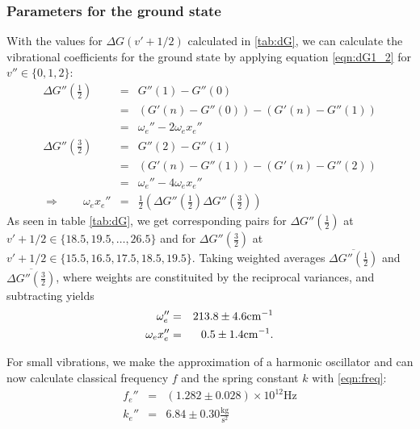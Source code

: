 \subsubsection{Parameters for the ground state}
With the values for $\Delta G(v' + 1/2)$ calculated in \ref{tab:dG}, we can calculate the vibrational coefficients for 
the ground state by applying equation \eqref{eqn:dG1_2} for $v'' \in \{0, 1, 2\}$:
\begin{eqnarray}
    \Delta G''\left ( \frac{1}{2} \right ) &=& G''(1) - G''(0) \nonumber\\
        &=& (G'(n) - G''(0)) - (G'(n) - G''(1)) \nonumber \\
        &=& \omega_e'' - 2 \omega_e x_e'' \\
    \Delta G''\left ( \frac{3}{2} \right ) &=& G''(2) - G''(1) \nonumber\\
        &=& (G'(n) - G''(1)) - (G'(n) - G''(2)) \nonumber \\
        &=& \omega_e'' - 4 \omega_e x_e'' \\
  \Rightarrow \qquad  \omega_e x_e'' &=& \frac{1}{2} \left ( \Delta G''\left ( \frac{1}{2} \right ) 
        \Delta G''\left ( \frac{3}{2} \right ) \right )
\end{eqnarray}
As seen in table \ref{tab:dG}, we get corresponding pairs for 
$\Delta G''\left ( \frac{1}{2} \right )$ at $v' + 1/2 \in \{18.5, 19.5, \ldots, 26.5\}$ 
and for 
$\Delta G''\left ( \frac{3}{2} \right )$ at $v' + 1/2 \in \{15.5, 16.5, 17.5, 18.5, 19.5\}$.
Taking weighted averages $\overline{\Delta G''\left ( \frac{1}{2} \right )}$ and 
$\overline{\Delta G''\left ( \frac{3}{2} \right )}$, 
where weights are constituited by the reciprocal variances, 
and subtracting yields
\begin{eqnarray}
    \omega_e'' &=& 213.8 \pm 4.6 \mathrm{cm^{-1}} \\
    \omega_e x_e'' &=& 0.5 \pm 1.4 \mathrm{cm^{-1}}.
\end{eqnarray}

For small vibrations, we make the approximation of a harmonic oscillator and 
can now calculate classical frequency $f$ and the spring constant $k$ with 
\eqref{eqn:freq}:
\begin{eqnarray}
    f_e'' &=& \left(1.282 \pm 0.028\right) \times 10^{12} \mathrm{Hz} \\
    k_e'' &=& 6.84 \pm 0.30 \mathrm{\frac{kg}{s^2}}
\end{eqnarray}

